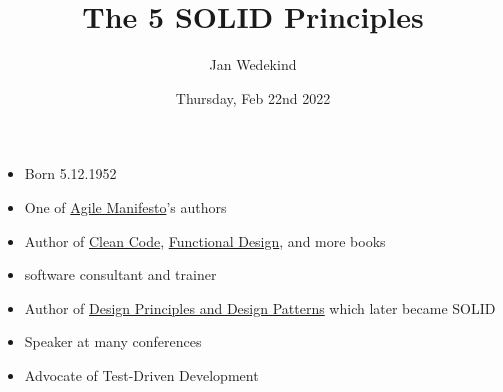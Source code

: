 \documentclass[calcdimensions,landscape,letterpaper]{powersem}
\title{The 5 SOLID Principles}
\author{Jan Wedekind}
\date{Thursday, Feb 22nd 2022}
\newcommand{\thecurrentheading}{}
\newcommand{\heading}[1]{\renewcommand{\thecurrentheading}{#1}}
\begin{document}
\begin{slide}
  \heading{\thetitle}
  \begin{center}
    \maketitle
  \end{center}
\end{slide}

\begin{slide}
  \heading{Robert C. Martin aka "Uncle Bob"}
  \begin{center}
    \begin{minipage}[c]{.4\textwidth}
    \end{minipage}
    \begin{minipage}[c]{.55\textwidth}
      \begin{itemize}
        \item Born 5.12.1952
        \item One of \href{https://agilemanifesto.org/}{Agile Manifesto}'s authors
        \item Author of \href{https://www.informit.com/store/clean-code-a-handbook-of-agile-software-craftsmanship-9780132350884}{Clean Code}, \href{https://www.informit.com/store/functional-design-principles-patterns-and-practices-9780138176396}{Functional Design}, and more books
        \item software consultant and trainer
        \item Author of \href{https://web.archive.org/web/20150906155800/http://www.objectmentor.com/resources/articles/Principles_and_Patterns.pdf}{Design Principles and Design Patterns} which later became SOLID
        \item Speaker at many conferences
        \item Advocate of Test-Driven Development
      \end{itemize}
    \end{minipage}
  \end{center}
\end{slide}
\end{document}
